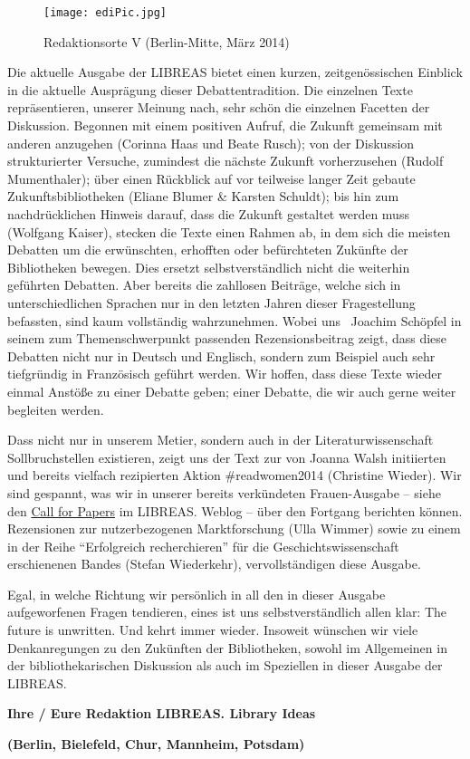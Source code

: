 \documentclass[a4paper,
fontsize=11pt,
oneside,
numbers=noperiodatend,
parskip=half-,
bibliography=totoc,
final
]{scrartcl}
\begin{document}
\begin{figure}[htbp]
\centering
\texttt{[image: ediPic.jpg]}
\caption{Redaktionsorte V (Berlin-Mitte, März 2014)}
\end{figure}

Die aktuelle Ausgabe der LIBREAS bietet einen kurzen, zeitgenössischen
Einblick in die aktuelle Ausprägung dieser Debattentradition. Die
einzelnen Texte repräsentieren, unserer Meinung nach, sehr schön die
einzelnen Facetten der Diskussion. Begonnen mit einem positiven Aufruf,
die Zukunft gemeinsam mit anderen anzugehen (Corinna Haas und Beate
Rusch); von der Diskussion strukturierter Versuche, zumindest die
nächste Zukunft vorherzusehen (Rudolf Mumenthaler); über einen Rückblick
auf vor teilweise langer Zeit gebaute Zukunftsbibliotheken (Eliane
Blumer \& Karsten Schuldt); bis hin zum nachdrücklichen Hinweis darauf,
dass die Zukunft gestaltet werden muss (Wolfgang Kaiser), stecken die
Texte einen Rahmen ab, in dem sich die meisten Debatten um die
erwünschten, erhofften oder befürchteten Zukünfte der Bibliotheken
bewegen. Dies ersetzt selbstverständlich nicht die weiterhin geführten
Debatten. Aber bereits die zahllosen Beiträge, welche sich in
unterschiedlichen Sprachen nur in den letzten Jahren dieser
Fragestellung befassten, sind kaum vollständig wahrzunehmen. Wobei uns~
Joachim Schöpfel in seinem zum Themenschwerpunkt passenden
Rezensionsbeitrag zeigt, dass diese Debatten nicht nur in Deutsch und
Englisch, sondern zum Beispiel auch sehr tiefgründig in Französisch
geführt werden. Wir hoffen, dass diese Texte wieder einmal Anstöße zu
einer Debatte geben; einer Debatte, die wir auch gerne weiter begleiten
werden.

Dass nicht nur in unserem Metier, sondern auch in der
Literaturwissenschaft Sollbruchstellen existieren, zeigt uns der Text
zur von Joanna Walsh initiierten und bereits vielfach rezipierten Aktion
\#readwomen2014 (Christine Wieder). Wir sind gespannt, was wir in
unserer bereits verkündeten Frauen-Ausgabe -- siehe den
\href{http://libreas.wordpress.com/2013/11/18/4384/}{Call for Papers} im
LIBREAS. Weblog -- über den Fortgang berichten können. Rezensionen zur
nutzerbezogenen Marktforschung (Ulla Wimmer) sowie zu einem in der Reihe
\enquote{Erfolgreich recherchieren} für die Geschichtswissenschaft
erschienenen Bandes (Stefan Wiederkehr), vervollständigen diese Ausgabe.

Egal, in welche Richtung wir persönlich in all den in dieser Ausgabe
aufgeworfenen Fragen tendieren, eines ist uns selbstverständlich allen
klar: The future is unwritten. Und kehrt immer wieder. Insoweit wünschen
wir viele Denkanregungen zu den Zukünften der Bibliotheken, sowohl im
Allgemeinen in der bibliothekarischen Diskussion als auch im Speziellen
in dieser Ausgabe der LIBREAS.

\textbf{Ihre / Eure Redaktion LIBREAS. Library Ideas}

\textbf{(Berlin, Bielefeld, Chur, Mannheim, Potsdam)}

\end{document}
